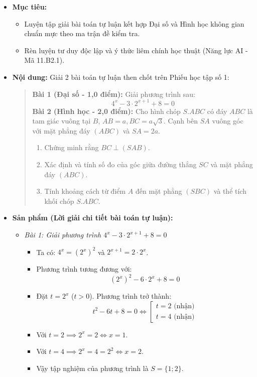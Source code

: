 \documentclass[12pt, a4paper]{article}
\begin{document}
\begin{itemize}[leftmargin=1.2cm]
    \item[a)] \textbf{Mục tiêu:}
    \begin{itemize}[leftmargin=0.6cm]
        \item Luyện tập giải bài toán tự luận kết hợp Đại số và Hình học không gian chuẩn mực theo ma trận đề kiểm tra.
        \item Rèn luyện tư duy độc lập và ý thức liêm chính học thuật (Năng lực AI - Mã 11.B2.1).
    \end{itemize}

    \item[b)] \textbf{Nội dung:} Giải 2 bài toán tự luận then chốt trên Phiếu học tập số 1:
    \begin{quote}
        \textbf{Bài 1 (Đại số - 1,0 điểm):} Giải phương trình sau:
        $$4^x - 3 \cdot 2^{x+1} + 8 = 0$$
        \textbf{Bài 2 (Hình học - 2,0 điểm):} Cho hình chóp $S.ABC$ có đáy $ABC$ là tam giác vuông tại $B$, $AB = a, BC = a\sqrt{3}$. Cạnh bên $SA$ vuông góc với mặt phẳng đáy $(ABC)$ và $SA = 2a$.
        \begin{enumerate}[leftmargin=0.6cm]
            \item Chứng minh rằng $BC \perp (SAB)$.
            \item Xác định và tính số đo của góc giữa đường thẳng $SC$ và mặt phẳng đáy $(ABC)$.
            \item Tính khoảng cách từ điểm $A$ đến mặt phẳng $(SBC)$ và thể tích khối chóp $S.ABC$.
        \end{enumerate}
    \end{quote}

    \item[c)] \textbf{Sản phẩm (Lời giải chi tiết bài toán tự luận):}
    \begin{itemize}[leftmargin=0.6cm]
        \item \textit{Bài 1: Giải phương trình $4^x - 3 \cdot 2^{x+1} + 8 = 0$}
        \begin{itemize}
            \item Ta có: $4^x = (2^x)^2$ và $2^{x+1} = 2 \cdot 2^x$.
            \item Phương trình tương đương với:
            $$(2^x)^2 - 6 \cdot 2^x + 8 = 0$$
            \item Đặt $t = 2^x$ ($t > 0$). Phương trình trở thành:
            $$t^2 - 6t + 8 = 0 \iff \left[\begin{array}{l} t = 2 \text{ (nhận)} \\ t = 4 \text{ (nhận)} \end{array}\right.$$
            \item Với $t = 2 \implies 2^x = 2 \iff x = 1$.
            \item Với $t = 4 \implies 2^x = 4 = 2^2 \iff x = 2$.
            \item Vậy tập nghiệm của phương trình là $S = \{1; 2\}$.
        \end{itemize}


\end{itemize}
\end{itemize}
\end{document}
